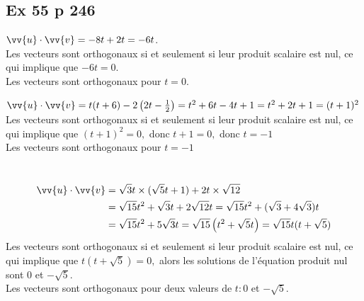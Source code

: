 \documentclass[12pt,a4paper]{book}
\begin{document}
 \subsection*{Ex 55 p 246}
 \begin{enumMet}
     \item $ \vv{u} \cdot  \vv{v}=-8 t+2 t=-6 t$.\\
     Les vecteurs sont orthogonaux si et seulement si leur produit scalaire est nul, ce qui implique que $-6 t=0$.\\
     Les vecteurs sont orthogonaux pour $t=0$. 
     \item $ \vv{u} \cdot  \vv{v}=t(t+6)-2\left(2 t-\frac{1}{2}\right)=t^{2}+6 t-4 t+1=t^{2}+2 t+1=(t+1)^{2}$\\
     Les vecteurs sont orthogonaux si et seulement si leur produit scalaire est nul, ce qui implique que $(t+1)^{2}=0,$ donc $t+1=0,$ donc $t=-1$\\
     Les vecteurs sont orthogonaux pour $t=-1$
     \item \ \\
     $$
 \begin{aligned}
  \vv{u} \cdot  \vv{v} &=\sqrt{3} t \times(\sqrt{5} t+1)+2 t \times \sqrt{12} \\
 &=\sqrt{15} t^{2}+\sqrt{3} t+2 \sqrt{12} t=\sqrt{15} t^{2}+(\sqrt{3}+4 \sqrt{3}) t \\
 &=\sqrt{15} t^{2}+5 \sqrt{3} t=\sqrt{15}\left(t^{2}+\sqrt{5} t\right)=\sqrt{15} t(t+\sqrt{5})
 \end{aligned}
 $$
 Les vecteurs sont orthogonaux si et seulement si leur produit scalaire est nul, ce qui implique que $t(t+\sqrt{5})=0,$ alors les solutions de l'équation produit nul sont 0 et $-\sqrt{5}$.\\
 Les vecteurs sont orthogonaux pour deux valeurs de $t: 0$ et $-\sqrt{5}$.
 \end{enumMet}
\end{document}
